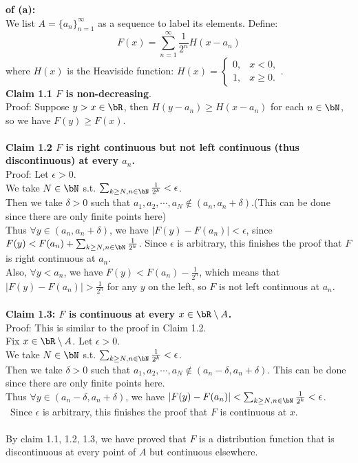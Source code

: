 \documentclass[lang=cn,11pt]{elegantbook}
\begin{document}
\begin{solution} \textbf{of (a):}\\
We list \( A = \{a_n\}_{n=1}^{\infty} \) as a sequence to label its elements. Define:
\[
F(x) = \sum_{n=1}^{\infty} \frac{1}{2^n} H(x - a_n)
\]
where \( H(x) \) is the Heaviside function: \(
H(x) =
\begin{cases}
0, & x < 0, \\
1, & x \geq 0.
\end{cases}
\).\\
\textbf{Claim 1.1 $F$ is non-decreasing}.\\
Proof: Suppose $y > x \in \bR$, then $H(y-a_n) \geq H(x-a_n)$ for each $n \in \bN$, so we have $F(y) \geq F(x)$.\\\\
\textbf{Claim 1.2 $F$ is right continuous but not left continuous (thus discontinuous) at every $a_n$.}\\
Proof: Let $\epsilon > 0$.\\
We take $N \in \bN$ s.t. $\sum_{k\geq N, n\in \bN} \frac{1}{2^k} < \epsilon$.\\
Then we take $\delta>0$ such that $a_1, a_2,\cdots, a_N \not \in (a_n, a_n+\delta)$.(This can be done since there are only finite points here)\\
Thus $\forall y \in (a_n, a_n+\delta)$, we have $|F(y) - F(a_n)| < \epsilon$, since $F(y) < F(a_n) + \sum_{k\geq N, n\in \bN} \frac{1}{2^k}$.
Since $\epsilon$ is arbitrary, this finishes the proof that $F$ is right continuous at $a_n$.\\
Also, $\forall y < a_n$, we have $F(y) < F(a_n) - \frac{1}{2^n}$, which means that $|F(y) -F(a_n)|>\frac{1}{2^n}$ for any $y$ on the left, so $F$ is not left continuous at $a_n$.\\\\
\textbf{Claim 1.3: $F$ is continuous at every $x \in \bR \setminus A$.}\\
Proof: This is similar to the proof in Claim 1.2. \\
Fix $x \in \bR \setminus A$. Let  $\epsilon > 0$.\\
We take $N \in \bN$ s.t. $\sum_{k\geq N, n\in \bN} \frac{1}{2^k} < \epsilon$.\\
Then we take $\delta>0$ such that $a_1, a_2,\cdots, a_N \not \in (a_n-\delta, a_n+\delta)$. This can be done since there are only finite points here.\\
Thus $\forall y \in (a_n-\delta, a_n+\delta)$, we have $|F(y) - F(a_n)| <\sum_{k\geq N, n\in \bN} \frac{1}{2^k} <  \epsilon$.\\\
Since $\epsilon$ is arbitrary, this finishes the proof that $F$ is continuous at $x$.\\\\

By claim 1.1, 1.2, 1.3, we have proved that $F$ is a distribution function that is discontinuous at every point of $A$ but continuous elsewhere.\\\\
\end{solution}
\end{document}
